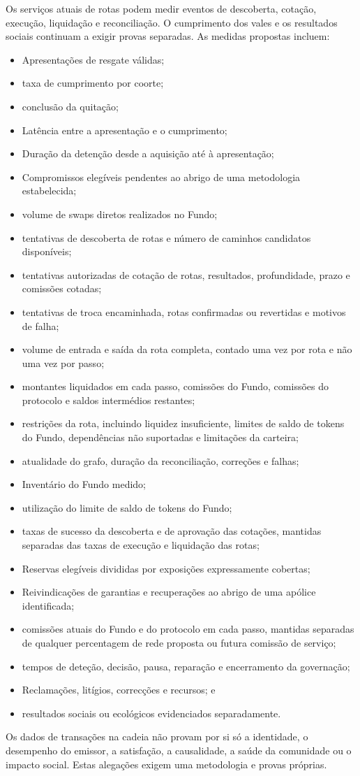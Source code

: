 \documentclass[11pt]{article}
\begin{document}
Os serviços atuais de rotas podem medir eventos de descoberta, cotação, execução, liquidação e reconciliação. O cumprimento dos vales e os resultados sociais continuam a exigir provas separadas. As medidas propostas incluem:

\begin{itemize}[leftmargin=*]
\item Apresentações de resgate válidas;
\item taxa de cumprimento por coorte;
\item conclusão da quitação;
\item Latência entre a apresentação e o cumprimento;
\item Duração da detenção desde a aquisição até à apresentação;
\item Compromissos elegíveis pendentes ao abrigo de uma metodologia estabelecida;
\item volume de swaps diretos realizados no Fundo;
\item tentativas de descoberta de rotas e número de caminhos candidatos disponíveis;
\item tentativas autorizadas de cotação de rotas, resultados, profundidade, prazo e comissões cotadas;
\item tentativas de troca encaminhada, rotas confirmadas ou revertidas e motivos de falha;
\item volume de entrada e saída da rota completa, contado uma vez por rota e não uma vez por passo;
\item montantes liquidados em cada passo, comissões do Fundo, comissões do protocolo e saldos intermédios restantes;
\item restrições da rota, incluindo liquidez insuficiente, limites de saldo de tokens do Fundo, dependências não suportadas e limitações da carteira;
\item atualidade do grafo, duração da reconciliação, correções e falhas;
\item Inventário do Fundo medido;
\item utilização do limite de saldo de tokens do Fundo;
\item taxas de sucesso da descoberta e de aprovação das cotações, mantidas separadas das taxas de execução e liquidação das rotas;
\item Reservas elegíveis divididas por exposições expressamente cobertas;
\item Reivindicações de garantias e recuperações ao abrigo de uma apólice identificada;
\item comissões atuais do Fundo e do protocolo em cada passo, mantidas separadas de qualquer percentagem de rede proposta ou futura comissão de serviço;
\item tempos de deteção, decisão, pausa, reparação e encerramento da governação;
\item Reclamações, litígios, correcções e recursos; e
\item resultados sociais ou ecológicos evidenciados separadamente.
\end{itemize}
Os dados de transações na cadeia não provam por si só a identidade, o desempenho do emissor, a satisfação, a causalidade, a saúde da comunidade ou o impacto social. Estas alegações exigem uma metodologia e provas próprias.
\end{document}
